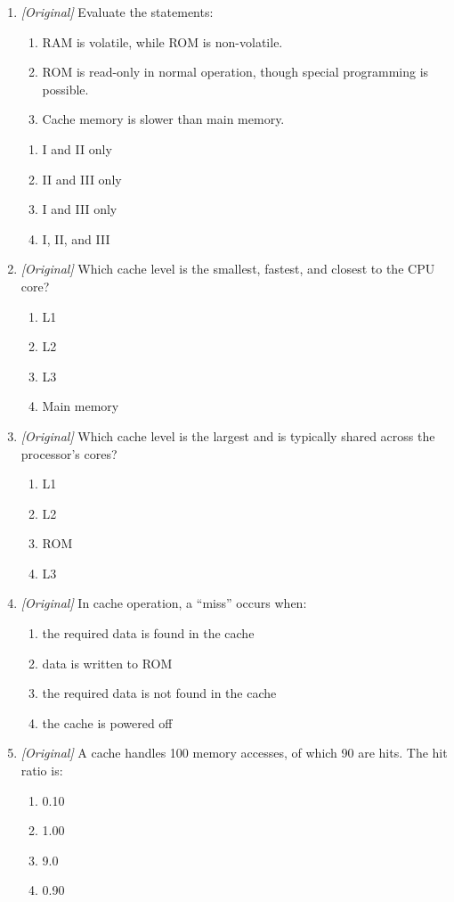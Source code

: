 \begin{enumerate}[label=\textbf{Q\arabic*.}, leftmargin=*]
\begin{enumerate}[label=\Alph*.]
    \item a type of CPU register
  \end{enumerate}
\item \textit{[Original]} Evaluate the statements:
  \begin{enumerate}[label=\Roman*.]
    \item RAM is volatile, while ROM is non-volatile.
    \item ROM is read-only in normal operation, though special programming
      is possible.
    \item Cache memory is slower than main memory.
  \end{enumerate}
  \begin{enumerate}[label=\Alph*.]
    \item I and II only
    \item II and III only
    \item I and III only
    \item I, II, and III
  \end{enumerate}
\item \textit{[Original]} Which cache level is the smallest, fastest, and
  closest to the CPU core?
  \begin{enumerate}[label=\Alph*.]
    \item L1
    \item L2
    \item L3
    \item Main memory
  \end{enumerate}
\item \textit{[Original]} Which cache level is the largest and is typically
  shared across the processor's cores?
  \begin{enumerate}[label=\Alph*.]
    \item L1
    \item L2
    \item ROM
    \item L3
  \end{enumerate}
\item \textit{[Original]} In cache operation, a ``miss'' occurs when:
  \begin{enumerate}[label=\Alph*.]
    \item the required data is found in the cache
    \item data is written to ROM
    \item the required data is not found in the cache
    \item the cache is powered off
  \end{enumerate}
\item \textit{[Original]} A cache handles 100 memory accesses, of which 90
  are hits. The hit ratio is:
  \begin{enumerate}[label=\Alph*.]
    \item 0.10
    \item 1.00
    \item 9.0
    \item 0.90
  \end{enumerate}


\end{enumerate}
